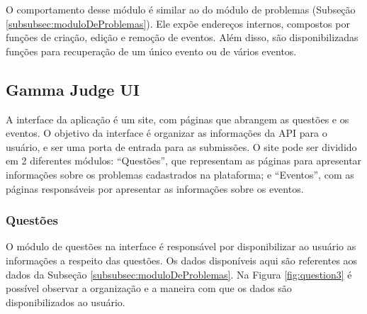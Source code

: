 O comportamento desse módulo é similar ao do módulo de problemas (Subseção \ref{subsubsec:moduloDeProblemas}). Ele expõe endereços internos, compostos por funções de criação, edição e remoção de eventos. Além disso, são disponibilizadas funções para recuperação de um único evento ou de vários eventos.

\subsection{Gamma Judge UI}
\label{sec:gamaJudgeUI}

A interface da aplicação é um site, com páginas que abrangem as questões e os eventos. O objetivo da interface é organizar as informações da API para o usuário, e ser uma porta de entrada para as submissões. O site pode ser dividido em 2 diferentes módulos: ``Questões'', que representam as páginas para apresentar informações sobre os problemas cadastrados na plataforma; e ``Eventos'', com as páginas responsáveis por apresentar as informações sobre os eventos. 




\subsubsection{Questões}

O módulo de questões na interface é responsável por disponibilizar ao usuário as informações a respeito das questões. Os dados disponíveis aqui são referentes aos dados da Subseção \ref{subsubsec:moduloDeProblemas}. Na Figura \ref{fig:question3} é possível observar a organização e a maneira com que os dados são disponibilizados ao usuário.

